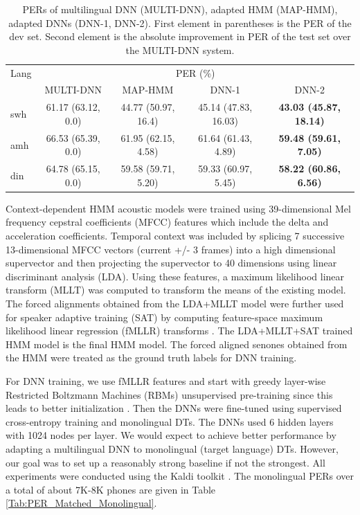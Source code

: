 \documentclass[a4paper]{article}
\begin{document}
\begin{table}[t]
\centering %
\caption{PERs of multilingual DNN (MULTI-DNN), adapted HMM (MAP-HMM), adapted DNNs (DNN-1, DNN-2). First element in parentheses is the PER of the dev set. Second element is the absolute improvement in PER of the test set over the MULTI-DNN system.}
\begin{tabular}{l|c c c c}
   \hline
Lang  & \multicolumn{4}{c}{PER (\%)} \\
        &MULTI-DNN        	   &MAP-HMM         		&DNN-1          &DNN-2          \\ \hline
swh      & 61.17 (63.12, 0.0) &44.77 (50.97, 16.4) &45.14 (47.83, 16.03) &\bf{43.03 (45.87, 18.14)}        \\
amh      & 66.53 (65.39, 0.0) &61.95 (62.15, 4.58)  &61.64  (61.43, 4.89) &\bf{59.48 (59.61, 7.05)}     \\
din      &64.78 (65.15, 0.0) &59.58 (59.71, 5.20)  &59.33 (60.97, 5.45)  &\bf{58.22 (60.86, 6.56)}    \\ \hline
\end{tabular}
\vspace{-5mm}
\label{Tab:PER_PT}
\end{table}

Context-dependent HMM acoustic models were trained using 39-dimensional Mel frequency cepstral coefficients (MFCC) features which include the delta and acceleration coefficients. Temporal context was included by splicing 7 successive 13-dimensional MFCC vectors (current +/- 3 frames) into a high dimensional supervector and then projecting the supervector to 40 dimensions using linear discriminant analysis (LDA). Using these features, a maximum likelihood linear transform (MLLT) \cite{Gopinath-MLLT} was computed to transform the means of the existing model. The forced alignments obtained from the LDA+MLLT model were further used for speaker adaptive training (SAT) by computing feature-space maximum likelihood linear regression (fMLLR) transforms \cite{Gales-CMLLR}. The LDA+MLLT+SAT trained HMM model is the final HMM model. The forced aligned senones obtained from the HMM were treated as the ground truth labels for DNN training.

For DNN training, we use fMLLR features and start with greedy layer-wise Restricted Boltzmann Machines (RBMs) unsupervised pre-training since this leads to better initialization \cite{Bengio-Pretraining}. Then the DNNs were fine-tuned using supervised cross-entropy training and monolingual DTs. The DNNs used 6 hidden layers with 1024 nodes per layer. We would expect to achieve better performance by adapting a multilingual DNN to monolingual (target language) DTs. However, our goal was to set up a reasonably strong baseline if not the strongest. All experiments were conducted using the Kaldi toolkit \cite{Povey-Kaldi}. The monolingual PERs over a total of about 7K-8K phones are given in Table \ref{Tab:PER_Matched_Monolingual}.
\end{document}
